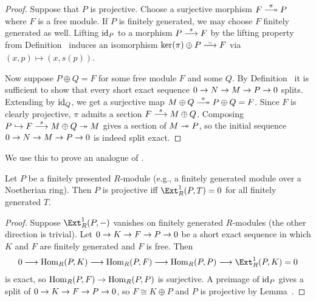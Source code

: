 \documentclass[a4paper,parskip=half,numbers=enddot, DIV=12]{scrreprt}
\begin{document}
\begin{proof}
	Suppose that $P$ is projective. Choose a surjective morphism $F\epimorphism[\pi]P$ where $F$ is a free module. If $P$ is finitely generated, we may choose $F$ finitely generated as well. Lifting $\operatorname{id}_P$ to a morphism $P\morphism[s]F$ by the lifting property from Definition~ induces an isomorphism $\ker(\pi)\oplus P\isomorphism F$ via $(x,p)\mapsto (x,s(p))$.
	
	Now suppose $P\oplus Q=F$ for some free module $F$ and some $Q$. By Definition~ it is sufficient to show that every short exact sequence $0\morphism N\morphism M\morphism P\morphism 0$ splits. Extending by $\operatorname{id}_Q$, we get a surjective map $M\oplus Q\epimorphism[\pi] P\oplus Q=F$. Since $F$ is clearly projective, $\pi$ admits a section $F\morphism[s]M\oplus Q$. Composing $P\monomorphism F\morphism[s]M\oplus Q\epimorphism M$ gives a section of $M\epimorphism P$, so the initial sequence $0\morphism N\morphism M\morphism P\morphism 0$ is indeed split exact.
\end{proof}
We use this to prove an analogue of .
\begin{cor}
	Let $P$ be a finitely presented $R$-module (e.g., a finitely generated module over a Noetherian ring). Then $P$ is projective iff $\Ext_R^1(P,T)=0$ for all finitely generated $T$.
\end{cor}
\begin{proof}
	Suppose $\Ext_R^1(P,-)$ vanishes on finitely generated $R$-modules (the other direction is trivial). Let $0\morphism K\morphism F\morphism P\morphism 0$ be a short exact sequence in which $K$ and $F$ are finitely generated and $F$ is free. Then 
	\begin{align*}
		0\morphism\Hom_R(P,K)\morphism\Hom_R(P,F)\morphism\Hom_R(P,P)\morphism\Ext_R^1(P,K)=0
	\end{align*}
	is exact, so $\Hom_R(P,F)\morphism\Hom_R(P,P)$ is surjective. A preimage of $\operatorname{id}_P$ gives a split of $0\morphism K\morphism F\morphism P\morphism 0$, so $F\cong K\oplus P$ and $P$ is projective by Lemma~.
\end{proof}
\end{document}
